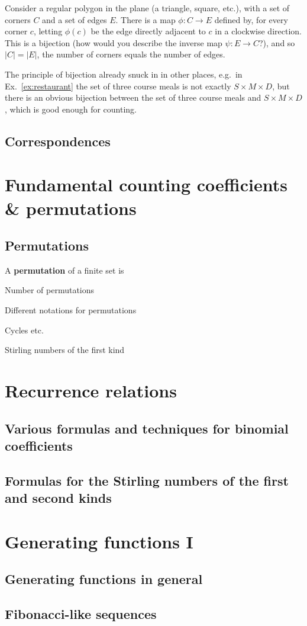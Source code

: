 \documentclass{amsart}
\begin{document}
\begin{nex}
	Consider a regular polygon in the plane (a triangle, square, etc.), with a set of corners $C$ and a set of edges $E$.
	There is a map $\phi \colon C \to E$ defined by, for every corner $c$, letting $\phi(c)$ be the edge directly adjacent to $c$ in a clockwise direction.
	This is a bijection (how would you describe the inverse map $\psi \colon E \to C$?), and so $|C| = |E|$, the number of corners equals the number of edges.
\end{nex}
	
\begin{nremark}
	The principle of bijection already snuck in in other places, e.g.~in Ex.~\ref{ex:restaurant} the set of three course meals is not exactly $S \times M \times D$, but there is an obvious bijection between the set of three course meals and $S \times M \times D$, which is good enough for counting.
\end{nremark}

\subsection{Correspondences}

\section{Fundamental counting coefficients \& permutations}

\subsection{Permutations}
\begin{ndefn}
	A \textbf{permutation} of a finite set is
\end{ndefn}

Number of permutations

Different notations for permutations

Cycles etc.

Stirling numbers of the first kind

\section{Recurrence relations}
\subsection{Various formulas and techniques for binomial coefficients}

\subsection{Formulas for the Stirling numbers of the first and second kinds}

\section{Generating functions I}

\subsection{Generating functions in general}

\subsection{Fibonacci-like sequences}
\end{document}
